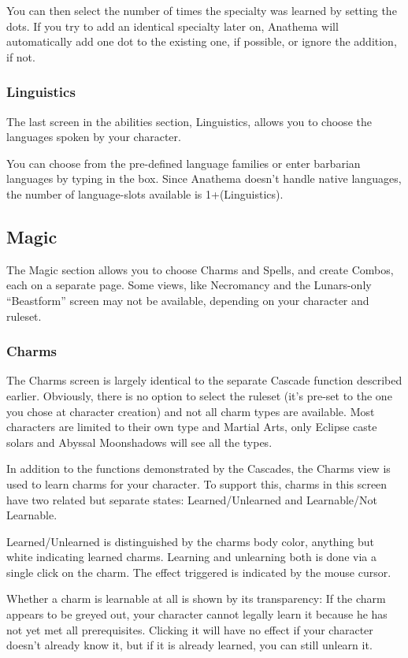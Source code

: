 You can then select the number of times the specialty was learned by setting the dots. If you try to add an identical specialty later on, Anathema will automatically add one dot to the existing one, if possible, or ignore the addition, if not.

\subsubsection{Linguistics}
The last screen in the abilities section, Linguistics, allows you to choose the languages spoken by your character.

You can choose from the pre-defined language families or enter barbarian languages by typing in the box. Since Anathema doesn't handle native languages, the number of language-slots available is 1+(Linguistics).

\subsection{Magic}
The Magic section allows you to choose Charms and Spells, and create Combos, each on a separate page. Some views, like Necromancy and the Lunars-only "`Beastform"' screen may not be available, depending on your character and ruleset.


\subsubsection{Charms}The Charms screen is largely identical to the separate Cascade function described earlier. Obviously, there is no option to select the ruleset (it's pre-set to the one you chose at character creation) and not all charm types are available. Most characters are limited to their own type and Martial Arts, only Eclipse caste solars and Abyssal Moonshadows will see all the types. 

In addition to the functions demonstrated by the Cascades, the Charms view is used to learn charms for your character. To support this, charms in this screen have two related but separate states: Learned/Unlearned and Learnable/Not Learnable. 

Learned/Unlearned is distinguished by the charms body color, anything but white indicating learned charms. Learning and unlearning both is done via a single click on the charm. The effect triggered is indicated by the mouse cursor.

Whether a charm is learnable at all is shown by its transparency: If the charm appears to be greyed out, your character cannot legally learn it because he has not yet met all prerequisites. Clicking it will have no effect if your character doesn't already know it, but if it is already learned, you can still unlearn it.

